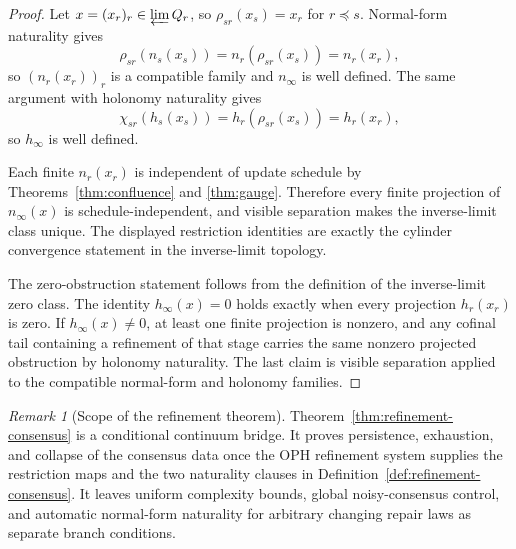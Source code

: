 \documentclass[11pt]{article}
\theoremstyle{remark}
\newtheorem{remark}[theorem]{Remark}
\theoremstyle{plain}
\begin{document}
\begin{proof}
Let \(x=(x_r)_r\in\varprojlim Q_r\), so \(\rho_{sr}(x_s)=x_r\) for \(r\preceq s\). Normal-form
naturality gives
\[
\rho_{sr}(n_s(x_s))
=
n_r(\rho_{sr}(x_s))
=
n_r(x_r),
\]
so \((n_r(x_r))_r\) is a compatible family and \(n_\infty\) is well defined. The same argument
with holonomy naturality gives
\[
\chi_{sr}(h_s(x_s))
=
h_r(\rho_{sr}(x_s))
=
h_r(x_r),
\]
so \(h_\infty\) is well defined.

Each finite \(n_r(x_r)\) is independent of update schedule by Theorems~\ref{thm:confluence} and
\ref{thm:gauge}. Therefore every finite projection of \(n_\infty(x)\) is schedule-independent,
and visible separation makes the inverse-limit class unique. The displayed restriction identities
are exactly the cylinder convergence statement in the inverse-limit topology.

The zero-obstruction statement follows from the definition of the inverse-limit zero class. The
identity \(h_\infty(x)=0\) holds exactly when every projection \(h_r(x_r)\) is zero. If
\(h_\infty(x)\ne0\), at least one finite projection is nonzero, and any cofinal tail containing a
refinement of that stage carries the same nonzero projected obstruction by holonomy naturality.
The last claim is visible separation applied to the compatible normal-form and holonomy families.
\end{proof}

\begin{remark}[Scope of the refinement theorem]\label{rem:refinement-consensus}
Theorem~\ref{thm:refinement-consensus} is a conditional continuum bridge. It proves persistence,
exhaustion, and collapse of the consensus data once the OPH refinement system supplies the
restriction maps and the two naturality clauses in Definition~\ref{def:refinement-consensus}. It
leaves uniform complexity bounds, global noisy-consensus control, and automatic normal-form
naturality for arbitrary changing repair laws as separate branch conditions.
\end{remark}
\end{document}
